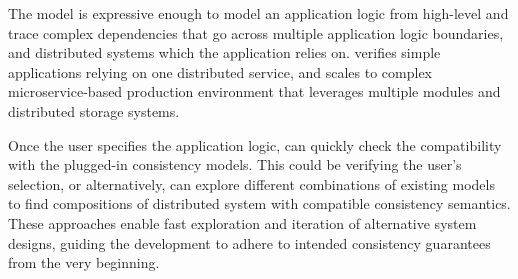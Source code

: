The \sysgraph{} model is expressive enough to model an application logic
from high-level and trace complex dependencies that go across multiple
application logic boundaries, and distributed systems which the application
relies on. \sysname{} verifies simple applications relying on one distributed service, and scales to complex
microservice-based production environment that leverages multiple modules and
distributed storage systems.

Once the user specifies the application logic, \sysname{} can quickly
check the compatibility with the plugged-in consistency models. This
could be verifying the user's selection, or alternatively, \sysname{}
can explore different combinations of existing models to
find compositions of distributed system with compatible consistency semantics.
These approaches enable fast exploration and iteration of alternative
system designs, guiding the development to adhere to intended
consistency guarantees from the very beginning.


